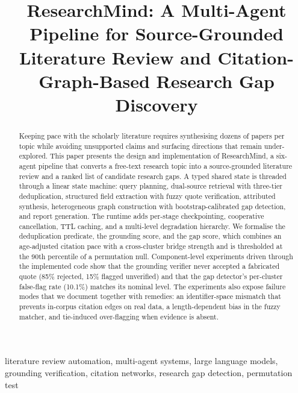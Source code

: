 \documentclass[conference]{IEEEtran}
\newcommand{\RM}{ResearchMind}
\begin{document}
\title{\RM: A Multi-Agent Pipeline for Source-Grounded Literature Review and Citation-Graph-Based Research Gap Discovery}

\author{
}

\maketitle

\begin{abstract}
Keeping pace with the scholarly literature requires synthesising dozens of papers per topic while avoiding unsupported claims and surfacing directions that remain under-explored. This paper presents the design and implementation of \RM, a six-agent pipeline that converts a free-text research topic into a source-grounded literature review and a ranked list of candidate research gaps. A typed shared state is threaded through a linear state machine: query planning, dual-source retrieval with three-tier deduplication, structured field extraction with fuzzy quote verification, attributed synthesis, heterogeneous graph construction with bootstrap-calibrated gap detection, and report generation. The runtime adds per-stage checkpointing, cooperative cancellation, TTL caching, and a multi-level degradation hierarchy. We formalise the deduplication predicate, the grounding score, and the gap score, which combines an age-adjusted citation pace with a cross-cluster bridge strength and is thresholded at the 90th percentile of a permutation null. Component-level experiments driven through the implemented code show that the grounding verifier never accepted a fabricated quote (85\% rejected, 15\% flagged unverified) and that the gap detector's per-cluster false-flag rate (10.1\%) matches its nominal level. The experiments also expose failure modes that we document together with remedies: an identifier-space mismatch that prevents in-corpus citation edges on real data, a length-dependent bias in the fuzzy matcher, and tie-induced over-flagging when evidence is absent.
\end{abstract}

\begin{IEEEkeywords}
literature review automation, multi-agent systems, large language models, grounding verification, citation networks, research gap detection, permutation test
\end{IEEEkeywords}
\end{document}
